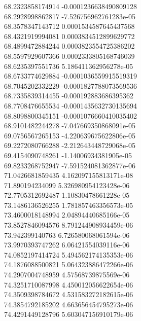 {68.2323858174914 -0.0001236638490809128 \\
68.2928998862817 -7.526756962761283e-05 \\
68.3578347143712 0.0001534587645437568 \\
68.4321919994081 0.0003834512899629772 \\
68.4899472884244 0.0003823554725386202 \\
68.5597929607366 0.0002333805168746039 \\
68.6235397551736 5.186411362956278e-05 \\
68.6733774629884 -0.0001036559915519319 \\
68.7045202332229 -0.0001827788073569536 \\
68.7335839314455 -0.000192883686395362 \\
68.7708476655534 -0.0001435632730135694 \\
68.8098800345151 -0.0001076660410035402 \\
68.9101482244278 -7.047669350868091e-05 \\
69.0756567265153 -4.220639675622806e-05 \\
69.2272080766288 -2.212643448729068e-05 \\
69.4154090748261 -1.14006934381905e-05 \\
69.8233268752947 -7.591524081362877e-06 \\
71.0426681859435 4.162097155813171e-08 \\
71.890194234099 5.326980954123428e-06 \\
72.7705312692487 1.10830478661228e-05 \\
73.1486136526255 1.781857463356573e-05 \\
73.4600018148994 2.04894440685166e-05 \\
73.8527846094576 8.791244908934459e-06 \\
73.942399140763 6.726580068061594e-06 \\
73.9970393747262 6.06421554039116e-06 \\
74.0852197414724 5.494562174135353e-06 \\
74.1876088500821 5.064323886472266e-06 \\
74.2907004748959 4.57568739875569e-06 \\
74.3251710087998 4.450012056622654e-06 \\
74.3509398784672 4.531583272182615e-06 \\
74.3854792185202 4.663656454795273e-06 \\
74.4291449128796 5.603047156910179e-06 \\
}
